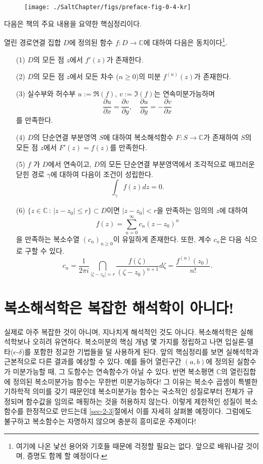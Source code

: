 \begin{figure}[!h]
\begin{center}
\texttt{[image: ./SaltChapter/figs/preface-fig-0-4-kr]}
\end{center}
\end{figure}

다음은 책의 주요 내용을 요약한 핵심정리이다.

\begin{salttheorem}{}{} \label{thm-0-2}
열린 경로연결 집합 $D$에 정의된 함수
$f:D\to \mathbb C$에 대하여 다음은 
동치이다\footnote{여기에 나온 낯선 용어와 기호들 때문에 걱정할 필요는 없다.
앞으로 배워나갈 것이며, 증명도 함께 할 예정이다.}.
\begin{itemize}
\item[(1)] $D$의 모든 점 $z$에서 $f'(z)$가 존재한다.
\item[(2)] $D$의 모든 점 $z$에서 모든 차수 ($n\ge0$)의 미분  $f^{(n)}(z)$가 존재한다.
\item[(3)] 실수부와 허수부 $u:=\Re(f)$, $v:=\Im(f)$는 연속미분가능하며 
$$
\frac{\partial u}{\partial x} = \frac{\partial v}{\partial y},
\quad
\frac{\partial u}{\partial y} = - \frac{\partial v}{\partial x}
$$
를 만족한다.
\item[(4)] $D$의 단순연결 부분영역 $S$에 대하여 
복소해석함수 $ F: S\to \mathbb C$가 존재하여
$S$의 모든 점 $z$에서 $F'(z)= f(z)$를 만족한다.
\item[(5)] $ f$ 가 $D$에서 연속이고, 
$D$의 모든 단순연결 부분영역에서
조각적으로 매끄러운 닫힌 경로 $\gamma$에 대하여 다음이 조건이 성립한다.
$$
\int_\gamma f(z)dz = 0.
$$
\item[(6)] $\{ z\in \mathbb C\,:\, |z-z_0| \le r \} \subset D$이면
$|z-z_0|<r$을 만족하는 임의의 $z$에 대하여
$$
f(z) = \sum_{n=0}^\infty c_n(z-z_0)^n
$$
을 만족하는 복소수열 $(c_n)_{n\ge0}$이 유일하게 존재한다.
또한, 계수 $c_n$은 다음 식으로 구할 수 있다.
$$
c_n = \dfrac1{2\pi i} \dint_{|\zeta-z_0|=r} \frac{f(\zeta)}{(\zeta-z_0)^{n+1}}d\zeta = \dfrac{f^{(n)}(z_0)}{n!}.
$$
\end{itemize}
\end{salttheorem}

\section*{복소해석학은 복잡한 해석학이 아니다!}


실제로 아주 복잡한 것이 아니며,  지나치게 해석적인 것도 아니다.
복소해석학은 실해석학보나 오히려 유연하다.
복소미분의 핵심 개념 몇 가지를 정립하고 나면 
입실론-델타($\epsilon$-$\delta$)를 포함한 정교한 기법들을 덜 사용하게 된다.
앞의 핵심정리를 보면 실해석학과 근본적으로 다른 결과를 예상할 수 있다.
예를 들어 열린구간 $(a,b)$에 정의된  실함수가 미분가능할 때, 그 도함수는 연속함수가 아닐 수 있다.
반면 복소평면 $\mathbb C$의 열린집합에 정의된 복소미분가능 함수는 
무한번 미분가능하다!
그 이유는 복소수 곱셈이 특별한 기하학적 의미를 갖기 때문인데
복소미분가능 함수는 국소적인 성질로부터 전체가 규정되며 
함수값을 임의로 매핑하는 것을 허용하지 않는다.
이렇게 제한적인 성질이 복소함수를 한정적으로 만드는데
\ref{sec-2-3}절에서 이를 자세히 살펴볼 예정이다.
그럼에도 불구하고 복소함수는 자명하지 않으며 충분히 흥미로운 주제이다!

